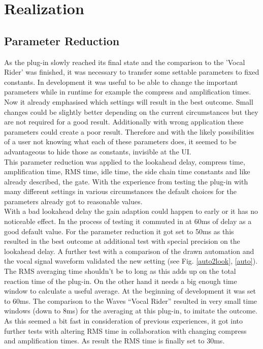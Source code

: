 \chapter{Realization}
\label{chapter:realization}

\section{Parameter Reduction}

As the plug-in slowly reached its final state and the comparison to the 'Vocal Rider' was finished, it was necessary to transfer some settable parameters to fixed constants. In development it was useful to be able to change the important parameters while in runtime for example the compress and amplification times. Now it already emphasised which settings will result in the best outcome. Small changes could be slightly better depending on the current circumstances but they are not required for a good result. Additionally with wrong application these parameters could create a poor result. Therefore and with the likely possibilities of a user not knowing what each of these parameters does, it seemed to be advantageous to hide those as constants, invisible at the UI.\\
This parameter reduction was applied to the lookahead delay, compress time, amplification time, RMS time, idle time, the side chain time constants and like already described, the gate. With the experience from testing the plug-in with many different settings in various circumstances the default choices for the parameters already got to reasonable values.\\
With a bad lookahead delay the gain adaption could happen to early or it has no noticeable effect. In the process of testing it commuted in at 60ms of delay as a good default value. For the parameter reduction it got set to 50ms as this resulted in the best outcome at additional test with special precision on the lookahead delay. A further test with a comparison of the drawn automation and the vocal signal waveform validated the new setting (see Fig. \ref{auto2look}, \ref{auto}).\\
The RMS averaging time shouldn’t be to long as this adds up on the total reaction time of the plug-in. On the other hand it needs a big enough time window to calculate a useful average. At the beginning of development it was set to 60ms. The comparison to the Waves “Vocal Rider” resulted in very small time windows (down to 8ms) for the averaging at this plug-in, to imitate the outcome. As this seemed a bit fast in consideration of previous experiences, it got into further tests with altering RMS time in collaboration with changing compress and amplification times. As result the RMS time is finally set to 30ms.\\
